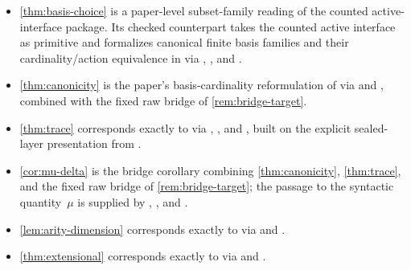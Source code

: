 \documentclass{lmcs}
\begin{document}
{\begin{itemize}[nosep]
\item \autoref{thm:basis-choice} is a paper-level subset-family reading of the counted active-interface package. Its checked counterpart takes the counted active interface as primitive and formalizes canonical finite basis families and their cardinality/action equivalence in  via , , and .
\item \autoref{thm:canonicity} is the paper's basis-cardinality reformulation of  via  and , combined with the fixed raw bridge of \autoref{rem:bridge-target}.
\item \autoref{thm:trace} corresponds exactly to  via , , and , built on the explicit sealed-layer presentation  from .
\item \autoref{cor:mu-delta} is the bridge corollary combining \autoref{thm:canonicity}, \autoref{thm:trace}, and the fixed raw bridge of \autoref{rem:bridge-target}; the passage to the syntactic quantity~$\mu$ is supplied by , , and .
\item \autoref{lem:arity-dimension} corresponds exactly to  via  and .
\item \autoref{thm:extensional} corresponds exactly to  via  and .

\end{itemize}}
\end{document}
